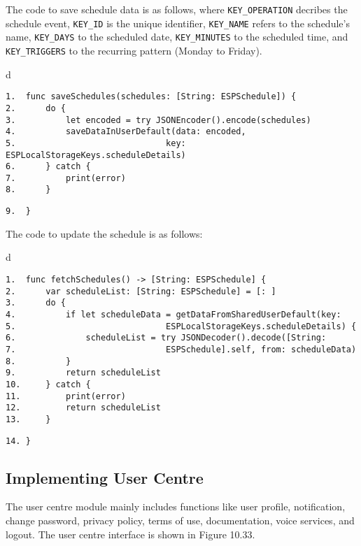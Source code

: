 \documentclass[a4paper,12pt]{book}
\begin{document}
The code to save schedule data is as follows, where \verb|KEY_OPERATION| decribes the schedule event, \verb|KEY_ID| is the unique identifier, \verb|KEY_NAME| refers to the schedule’s name, \verb|KEY_DAYS| to the scheduled date, \verb|KEY_MINUTES| to the scheduled time, and \verb|KEY_TRIGGERS| to the recurring pattern (Monday to Friday).

\begin{codebloc}
\begin{tabular}{d}
\vspace{2pt}
\begin{verbatim}
1.  func saveSchedules(schedules: [String: ESPSchedule]) {
2.      do {
3.          let encoded = try JSONEncoder().encode(schedules)
4.          saveDataInUserDefault(data: encoded, 
5.                              key: ESPLocalStorageKeys.scheduleDetails)
6.      } catch {
7.          print(error)
8.      }
\end{verbatim}
\verb|9.  }|
\end{tabular}
\end{codebloc}

The code to update the schedule is as follows:

\begin{codebloc}
\begin{tabular}{d}
\vspace{2pt}
\begin{verbatim}
1.  func fetchSchedules() -> [String: ESPSchedule] {
2.      var scheduleList: [String: ESPSchedule] = [: ]
3.      do {
4.          if let scheduleData = getDataFromSharedUserDefault(key:
5.                              ESPLocalStorageKeys.scheduleDetails) {
6.              scheduleList = try JSONDecoder().decode([String:
7.                              ESPSchedule].self, from: scheduleData)
8.          }
9.          return scheduleList
10.     } catch {
11.         print(error)
12.         return scheduleList
13.     }
\end{verbatim}
\verb|14. }|
\end{tabular}
\end{codebloc}

\subsection{Implementing User Centre}

The user centre module mainly includes functions like user profile, notification, change password, privacy policy, terms of use, documentation, voice services, and logout. The user centre interface is shown in Figure 10.33.
\end{document}
